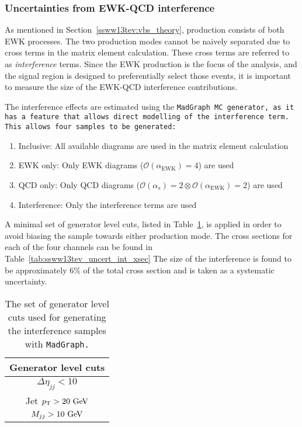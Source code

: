 \subsubsection{Uncertainties from EWK-QCD interference}\label{ssww13tev:interference}
As mentioned in Section~\ref{ssww13tev:vbs_theory}, \ssww production consists of both EWK processes.
The two production modes cannot be naively separated due to cross terms in the matrix element calculation.
These cross terms are referred to as \emph{interference} terms.
Since the \ssww EWK production is the focus of the analysis, and the signal region is designed to preferentially select those events, it is important to measure the size of the EWK-QCD interference contributions.

The interference effects are estimated using the \tt{MadGraph} MC generator, as it has a feature that allows direct modelling of the interference term.
This allows four samples to be generated:
\begin{enumerate}
\item Inclusive: All available diagrams are used in the matrix element calculation
\item EWK only: Only EWK diagrams ($\mathcal{O}(\alpha_{\textrm{EWK}}) = 4$) are used
\item QCD only: Only QCD diagrams ($\mathcal{O}(\alpha_s) = 2 \otimes \mathcal{O}(\alpha_{\textrm{EWK}}) = 2$) are used
\item Interference: Only the interference terms are used
\end{enumerate}
A minimal set of generator level cuts, listed in Table~\ref{tab:ssww13tev_uncert_int_cuts}, is applied in order to avoid biasing the sample towards either production mode.
The cross sections for each of the four channels can be found in Table~\ref{tab:ssww13tev_uncert_int_xsec}
The size of the interference is found to be approximately $6\%$ of the total cross section and is taken as a systematic uncertainty.

\begin{table}[htbp]
  \centering
  \begin{tabular}{c}
    Generator level cuts\\
    \hline\hline
    $\Delta\eta_{jj} < 10$ \\
    Jet $\pt > 20\gev$ \\
    $M_{jj} > 10\gev$ \\
    \hline
  \end{tabular}
  \caption{The set of generator level cuts used for generating the interference samples with \tt{MadGraph}.}
  \label{tab:ssww13tev_uncert_int_cuts}
\end{table}

